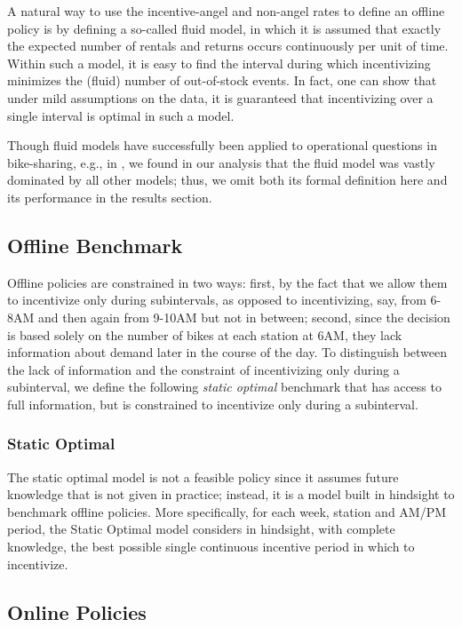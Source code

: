 A natural way to use the incentive-angel and non-angel rates to define an offline policy is by defining a so-called fluid model, in which it is assumed that exactly the expected number of rentals and returns occurs continuously per unit of time. Within such a model, it is easy to find the interval during which incentivizing minimizes the (fluid) number of out-of-stock events. In fact, one can show that under mild assumptions on the data, it is guaranteed that incentivizing over a single interval is optimal in such a model.

Though fluid models have successfully been applied to operational questions in bike-sharing, e.g., in \cite{jianetal}, we found in our analysis that the fluid model was vastly dominated by all other models; thus, we omit both its formal definition here and its performance in the results section.

\subsection{Offline Benchmark}

Offline policies are constrained in two ways: first, by the fact that we allow them to incentivize only during subintervals, as opposed to incentivizing, say, from 6-8AM and then again from 9-10AM but not in between; second, since the decision is based solely on the number of bikes at each station at 6AM, they lack information about demand later in the course of the day. To distinguish between the lack of information and the constraint of incentivizing only during a subinterval, we define the following \emph{static optimal} benchmark that has access to full information, but is constrained to incentivize only during a subinterval.

\subsubsection{Static Optimal}
The static optimal model is not a feasible policy since it assumes future knowledge that is not given in practice; instead, it is a model built in hindsight to benchmark offline policies. More specifically, for each week, station and AM/PM period, the Static Optimal model considers in hindsight, with complete knowledge, the best possible single continuous incentive period in which to incentivize.

\subsection{Online Policies}

